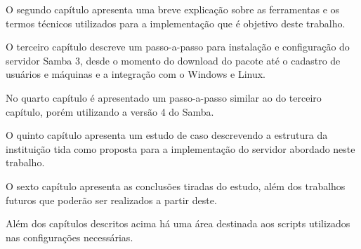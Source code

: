 O segundo capítulo apresenta uma breve explicação sobre as ferramentas e os termos técnicos utilizados para a implementação que é objetivo deste trabalho. 

O terceiro capítulo descreve um passo-a-passo para instalação e configuração do servidor Samba 3, desde o momento do download do pacote até o cadastro de usuários e máquinas e a integração com o Windows e Linux.

No quarto capítulo é apresentado um passo-a-passo similar ao do terceiro capítulo, porém utilizando a versão 4 do Samba.

O quinto capítulo apresenta um estudo de caso descrevendo a estrutura da instituição tida como proposta para a implementação do servidor abordado neste trabalho.

O sexto capítulo apresenta as conclusões tiradas do estudo, além dos trabalhos futuros que poderão ser realizados a partir deste.

Além dos capítulos descritos acima há uma área destinada aos scripts utilizados nas configurações necessárias.